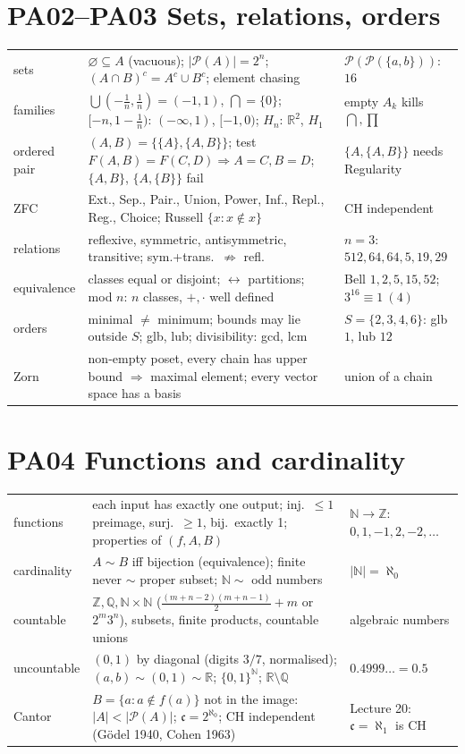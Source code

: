 \documentclass[9pt]{article}
\begin{document}
\section*{PA02--PA03 Sets, relations, orders}
\begin{tabular}{@{}p{2.9cm}p{8.4cm}p{6.1cm}@{}}
\toprule
sets & $\varnothing\subseteq A$ (vacuous); $|\mathcal P(A)|=2^n$; $(A\cap B)^c=A^c\cup B^c$; element chasing & $\mathcal P(\mathcal P(\{a,b\}))$: $16$\\
families & $\bigcup(-\tfrac1n,\tfrac1n)=(-1,1)$, $\bigcap=\{0\}$; $[-n,1-\tfrac1n)$: $(-\infty,1)$, $[-1,0)$; $H_n$: $\mathbb R^2$, $H_1$ & empty $A_k$ kills $\bigcap,\prod$\\
ordered pair & $(A,B)=\{\{A\},\{A,B\}\}$; test $F(A,B)=F(C,D)\Rightarrow A=C,B=D$; $\{A,B\}$, $\{A,\{B\}\}$ fail & $\{A,\{A,B\}\}$ needs Regularity\\
ZFC & Ext., Sep., Pair., Union, Power, Inf., Repl., Reg., Choice; Russell $\{x:x\notin x\}$ & CH independent\\
relations & reflexive, symmetric, antisymmetric, transitive; sym.+trans.\ $\not\Rightarrow$ refl. & $n{=}3$: $512,64,64,5,19,29$\\
equivalence & classes equal or disjoint; $\leftrightarrow$ partitions; mod $n$: $n$ classes, $+,\cdot$ well defined & Bell $1,2,5,15,52$; $3^{16}\equiv1\ (4)$\\
orders & minimal $\ne$ minimum; bounds may lie outside $S$; glb, lub; divisibility: gcd, lcm & $S=\{2,3,4,6\}$: glb $1$, lub $12$\\
Zorn & non-empty poset, every chain has upper bound $\Rightarrow$ maximal element; every vector space has a basis & union of a chain\\
\bottomrule
\end{tabular}

\section*{PA04 Functions and cardinality}
\begin{tabular}{@{}p{2.9cm}p{8.4cm}p{6.1cm}@{}}
\toprule
functions & each input has exactly one output; inj.\ $\le1$ preimage, surj.\ $\ge1$, bij.\ exactly 1; properties of $(f,A,B)$ & $\mathbb N\to\mathbb Z$: $0,1,-1,2,-2,\dots$\\
cardinality & $A\sim B$ iff bijection (equivalence); finite never $\sim$ proper subset; $\mathbb N\sim$ odd numbers & $|\mathbb N|=\aleph_0$\\
countable & $\mathbb Z,\mathbb Q,\mathbb N\times\mathbb N$ ($\tfrac{(m+n-2)(m+n-1)}2+m$ or $2^m3^n$), subsets, finite products, countable unions & algebraic numbers\\
uncountable & $(0,1)$ by diagonal (digits $3/7$, normalised); $(a,b)\sim(0,1)\sim\mathbb R$; $\{0,1\}^{\mathbb N}$; $\mathbb R\setminus\mathbb Q$ & $0.4999\ldots=0.5$\\
Cantor & $B=\{a:a\notin f(a)\}$ not in the image: $|A|<|\mathcal P(A)|$; $\mathfrak c=2^{\aleph_0}$; CH independent (G\"odel 1940, Cohen 1963) & Lecture 20: $\mathfrak c=\aleph_1$ is CH\\
\bottomrule
\end{tabular}
\end{document}
